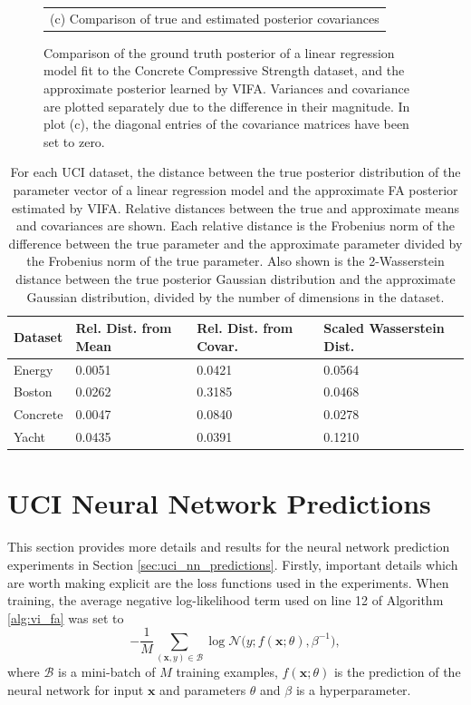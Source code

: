 \documentclass[msc,deptreport.inf]{infthesis} %
\newcommand{\matr}[1]{\mathbf{#1}}
\begin{document}
\begin{figure}[!htbp]
\begin{tabular}{c}
		(c) Comparison of true and estimated posterior covariances \\[6pt] 
	\end{tabular}
	\caption{Comparison of the ground truth posterior of a linear regression model fit to the Concrete Compressive Strength dataset, and the approximate posterior learned by VIFA. Variances and covariance are plotted separately due to the difference in their magnitude. In plot (c), the diagonal entries of the covariance matrices have been set to zero.}
	\label{fig:posterior_concrete_strength}
\end{figure} 

\begin{table}[h!]
	\begin{center}
		\begin{tabular}{@{} llll @{}} 
 			\toprule
 			Dataset & Rel. Dist. from Mean & Rel. Dist. from Covar. & Scaled Wasserstein Dist. \\ 
 			\midrule
			Energy 	& 0.0051 	& 0.0421 & 0.0564 \\ 
			Boston  	& 0.0262 	& 0.3185 & 0.0468 \\ 
			Concrete  	& 0.0047 	& 0.0840 & 0.0278 \\ 
 			Yacht 	& 0.0435 	& 0.0391 & 0.1210 \\ 
			\bottomrule
		\end{tabular}
		\caption{For each UCI dataset, the distance between the true posterior distribution of the parameter vector of a linear regression model and the approximate FA posterior estimated by VIFA. Relative distances between the true and approximate means and covariances are shown. Each relative distance is the Frobenius norm of the difference between the true parameter and the approximate parameter divided by the Frobenius norm of the true parameter. Also shown is the 2-Wasserstein distance between the true posterior Gaussian distribution and the approximate Gaussian distribution, divided by the number of dimensions in the dataset.}
		\label{table:linear_regression_vi_posterior_uci}
	\end{center}
\end{table}

\section{UCI Neural Network Predictions}\label{app:uci_nn_predictions}

This section provides more details and results for the neural network prediction experiments in Section \ref{sec:uci_nn_predictions}. Firstly, important details which are worth making explicit are the loss functions used in the experiments. When training, the average negative log-likelihood term used on line 12 of Algorithm \ref{alg:vi_fa} was set to
\begin{equation}\label{eqn:train_nll}
	-\frac{1}{M} \sum_{(\matr{x}, y) \in \mathcal{B}} \log \mathcal{N}\big(y; f(\matr{x}; \theta), \beta^{-1}\big),
\end{equation}
where $\mathcal{B}$ is a mini-batch of $M$ training examples, $f(\matr{x}; \theta)$ is the prediction of the neural network for input $\matr{x}$ and parameters $\theta$ and $\beta$ is a hyperparameter. 
\end{document}
